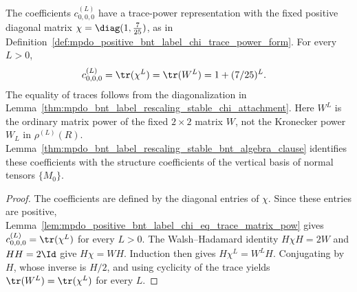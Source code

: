\begin{lemma}%
    \label{thm:mpdo_bnt_label_rescaling_stable_chi_uniform}
    \leanok
    The coefficients $c^{(L)}_{0,0,0}$ have a trace-power representation
    with the fixed positive diagonal matrix
    $\chi=\diag(1,\tfrac{7}{25})$, as in
    Definition~\ref{def:mpdo_positive_bnt_label_chi_trace_power_form}.
    For every $L>0$,
    \begin{align}
        c^{(L)}_{0,0,0} & =\tr(\chi^L)=\tr(W^L)=1+(7/25)^L.
        \notag
    \end{align}
    The equality of traces follows from the diagonalization in
    Lemma~\ref{thm:mpdo_bnt_label_rescaling_stable_chi_attachment}.
    Here $W^L$ is the ordinary matrix power of the fixed $2\times2$
    matrix $W$, not the Kronecker power $W_L$ in $\rho^{(L)}(R)$.
    Lemma~\ref{thm:mpdo_bnt_label_rescaling_stable_bnt_algebra_clause}
    identifies these coefficients with the structure coefficients of the
    vertical basis of normal tensors $\{M_0\}$.
\end{lemma}
\begin{proof}\leanok
    The coefficients are defined by the diagonal entries of $\chi$.
    Since these entries are positive,
    Lemma~\ref{lem:mpdo_positive_bnt_label_chi_eq_trace_matrix_pow}
    gives $c^{(L)}_{0,0,0}=\tr(\chi^L)$ for every $L>0$.
    The Walsh--Hadamard identity $H\chi H=2W$ and $HH=2\Id$ give
    $H\chi=WH$. Induction then gives $H\chi^L=W^L H$.
    Conjugating by $H$, whose inverse is $H/2$, and using cyclicity
    of the trace yields $\tr(W^L)=\tr(\chi^L)$ for every $L$.
\end{proof}
